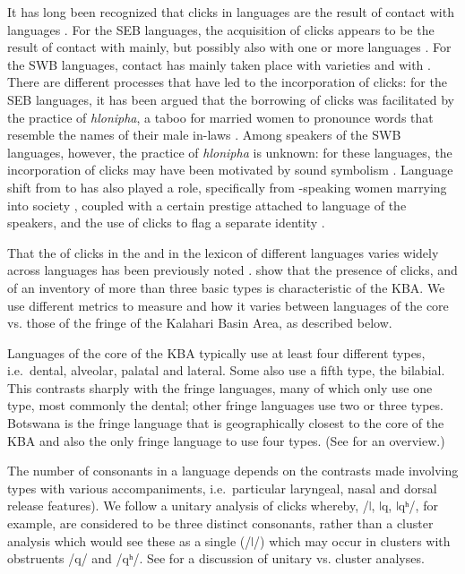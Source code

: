 \documentclass[output=paper
,newtxmath
,modfonts
,nonflat]{langsci/langscibook}
\begin{document}
It has long been recognized that clicks in  languages are the result of contact with  languages \citep{Bleek1862}. For the SEB languages, the acquisition of clicks appears to be the result of contact with  mainly, but possibly also with one or more  languages \citep{Pakendorf2017}. For the SWB languages, contact has mainly taken place with  varieties and with  \citep{Gunnink2015}. There are different processes that have led to the incorporation of clicks: for the SEB languages, it has been argued that the borrowing of clicks was facilitated by the practice of \textit{hlonipha}, a taboo for married women to pronounce words that resemble the names of their male in-laws \citep{Herbert1990}. Among speakers of the SWB languages, however, the practice of \textit{hlonipha} is unknown: for these languages, the incorporation of clicks may have been motivated by sound symbolism \citep{BostoenSands2012}. Language shift from  to  has also played a role, specifically from -speaking women marrying into  society \citep{Pakendorf2011}, coupled with a certain prestige attached to language of the  speakers, and the use of clicks to flag a separate identity \citep{Gunnink2015}. 

That the  of clicks in the  and in the lexicon of different  languages varies widely across languages has been previously noted \citep{Güldemann2008}. \citet{naumann2015} show that the presence of clicks, and of an inventory of more than three basic  types is characteristic of the KBA. We use different metrics to measure  and how it varies between languages of the core vs. those of the fringe of the Kalahari Basin Area, as described below. 

Languages of the core of the KBA typically use at least four different  types, i.e.\ dental, alveolar, palatal and lateral. Some also use a fifth  type, the bilabial. This contrasts sharply with the fringe languages, many of which only use one  type, most commonly the dental; other fringe languages use two or three  types. Botswana  is the fringe language that is geographically closest to the core of the KBA and also the only fringe language to use four  types. (See  for an overview.) 

The number of  consonants in a language depends on the contrasts made involving  types with various  accompaniments, i.e.\ particular laryngeal, nasal and dorsal release features). We follow a unitary analysis of clicks whereby, /ǀ, ǀq, ǀqʰ/, for example, are considered to be three distinct consonants, rather than a cluster analysis which would see these as a single  (/ǀ/) which may occur in clusters with obstruents /q/ and /qʰ/. See \citet{Bradfield2014} for a discussion of unitary vs. cluster analyses. 
\end{document}
